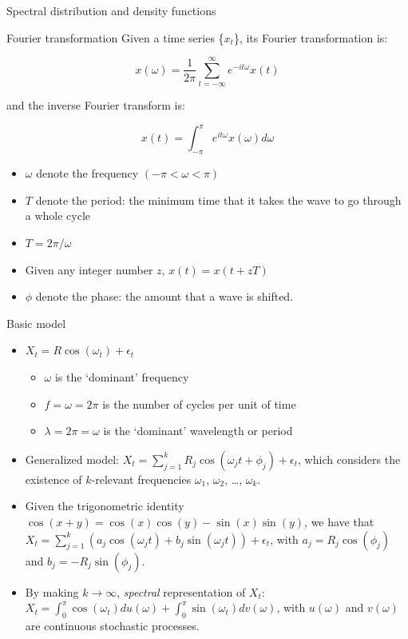 \documentclass[
  ignorenonframetext,
]{beamer}
\providecommand{\tightlist}{%
  \setlength{\itemsep}{0pt}\setlength{\parskip}{0pt}}
\begin{document}
\begin{frame}{Spectral distribution and density functions}
\protect\hypertarget{spectral-distribution-and-density-functions}{}
\begin{block}{Fourier transformation}
\protect\hypertarget{fourier-transformation}{}
Given a time series \{\(x_t\)\}, its Fourier transformation is:

\[
x(\omega) = \frac {1} {2\pi} \sum_{t=-\infty}^\infty e^{−it\omega}x(t)
\]

and the inverse Fourier transform is:

\[
x(t) = \int_{−\pi} ^{\pi} e^{it\omega}x(\omega)d\omega
\]

\begin{itemize}
\tightlist
\item
  \(\omega\) denote the frequency \((−\pi < \omega < \pi)\)
\item
  \(T\) denote the period: the minimum time that it takes the wave to go
  through a whole cycle
\item
  \(T = 2\pi/\omega\)
\item
  Given any integer number \(z\), \(x(t) = x(t + zT)\)
\item
  \(\phi\) denote the phase: the amount that a wave is shifted.
\end{itemize}
\end{block}

\begin{block}{Basic model}
\protect\hypertarget{basic-model}{}
\begin{itemize}
\item
  \(X_t = R\cos(\omega_t) + \epsilon_t\)

  \begin{itemize}
  \tightlist
  \item
    \(\omega\) is the `dominant' frequency
  \item
    \(f = \omega = 2\pi\) is the number of cycles per unit of time
  \item
    \(\lambda = 2\pi=\omega\) is the `dominant' wavelength or period
  \end{itemize}
\item
  Generalized model:
  \(X_t = \sum^k_{j=1} R_j \cos(\omega_jt + \phi_j) + \epsilon_t\),
  which considers the existence of \(k\)-relevant frequencies
  \(\omega_1\), \(\omega_2\), \ldots, \(\omega_k\).
\item
  Given the trigonometric identity
  \(\cos(x + y) = \cos(x)\cos(y) − \sin(x)\sin(y)\), we have that
  \(X_t = \sum^k_{j=1} (a_j \cos(\omega_jt) + b_j \sin(\omega_jt)) + \epsilon_t\),
  with \(a_j = R_j\cos(\phi_j)\) and \(b_j = −R_j\sin(\phi_j)\).
\item
  By making \(k \rightarrow \infty\), \emph{spectral} representation of
  \(X_t\):
  \(X_t = \int_0^\pi \cos(\omega_t)du(\omega) + \int_0^\pi \sin(\omega_t)dv(\omega)\),
  with \(u(\omega)\) and \(v(\omega)\) are continuous stochastic
  processes.
\end{itemize}
\end{block}
\end{frame}
\end{document}

